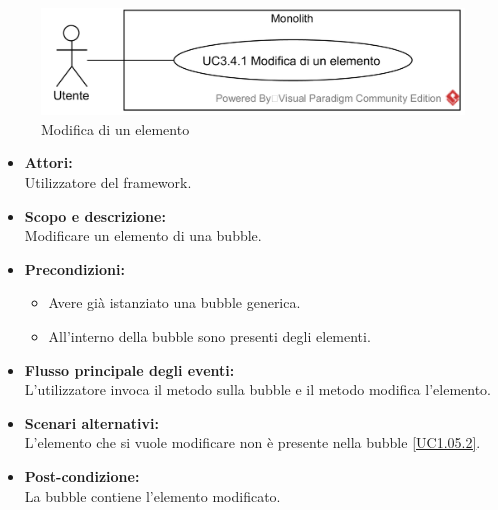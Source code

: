 \begin{samepage}
\isfirsttrue
{}
\nopagebreak
\begin{figure}[H]
	\centering
	\includegraphics[width=15cm]{../../documenti/AnalisiDeiRequisiti/Diagrammi_img/usecase/uc1_05.png}
	\caption{\UCCCaption{} Modifica di un elemento}
\end{figure}
\end{samepage}

\begin{itemize}
	\item \textbf{Attori:}
	\\Utilizzatore del framework.
	\item \textbf{Scopo e descrizione:} 
	\\Modificare un elemento di una bubble.
	\item \textbf{Precondizioni:}
	\begin{itemize}
		\item Avere già istanziato una bubble generica.
		\item All'interno della bubble sono presenti degli elementi.
	\end{itemize}
	\item \textbf{Flusso principale degli eventi:}
	\\L'utilizzatore invoca il metodo sulla bubble e il metodo modifica l'elemento.
	\item \textbf{Scenari alternativi:}
	\\L'elemento che si vuole modificare non è presente nella bubble \ref{UC1.05.2}.
	\item \textbf{Post-condizione:}
	\\La bubble contiene l'elemento modificato.
\end{itemize}


